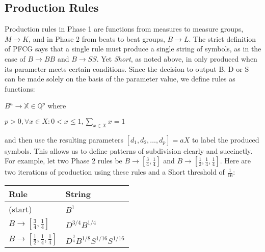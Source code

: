 \documentclass{article}
\begin{document}








\subsection{Production Rules}

Production rules in Phase 1 are functions from measures to measure groups, $M \rightarrow K$, and in Phase 2 from beats to beat groups, $B \rightarrow L$. The strict definition of PFCG says that a single rule must produce a single string of symbols, as in the case of $B \rightarrow BB$ and $B \rightarrow SS$.  Yet \emph{Short}, as noted above, in only produced when its parameter meets certain conditions. Since the decision to output B, D or S can be made solely on the basis of the parameter value, we define rules as functions:

$B^a \rightarrow \mathbb{X} \in \mathbb{Q}^{p}$ where 

$p > 0 , \forall x \in X: 0 < x \leq 1, \sum_{x \in X} x = 1$

and then use the resulting parameters $[d_1,d_2,…,d_p]=aX$ to label the produced symbols. This allows us to define patterns of subdivision clearly and succinctly. For example, let two Phase 2 rules be $B \rightarrow [\frac{3}{4}, \frac{1}{4}]$ and $B \rightarrow [\frac{1}{2}, \frac{1}{4}, \frac{1}{4}]$. Here are two iterations of production using these rules and a Short threshold of $\frac{1}{16}$:

\bgroup
\def\arraystretch{1.5}
\begin{center}
\begin{tabular}{ l l }
 Rule & String \\
 \hline
 (start)                                                  & $B^{1}$ \\
 $B \rightarrow [\frac{3}{4}, \frac{1}{4}]$               & $D^{3/4} B^{1/4}$ \\
 $B \rightarrow [\frac{1}{2}, \frac{1}{4}, \frac{1}{4}]$  & $D^{\frac{3}{4}} B^{1/8} S^{1/16} S^{1/16}$ \\
\end{tabular}
\end{center}
\egroup
\end{document}
